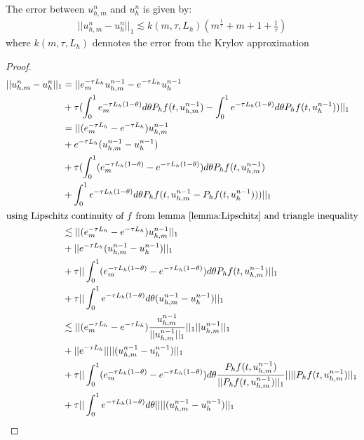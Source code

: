 \begin{lemma}
    The error between $u_{h,m}^n$ and $u_{h}^n$ is given by:
    \begin{align*}
        ||u_{h,m}^n - u_{h}^n||_1 \lesssim k(m,\tau, L_h)(m^\frac{1}{\tau} + m + 1 + \frac{1}{\tau})
    \end{align*}
    where $k(m,\tau,L_h)$ dennotes the error from the Krylov approximation
\end{lemma}
\begin{proof}
    \begin{align*}
        ||u_{h,m}^n - u_{h}^n||_1 &= ||e_m^{-\tau L_h}u_{h,m}^{n-1} - e^{-\tau L_h}u_{h}^{n-1}\\
        & + \tau(\int^1_0e_m^{-\tau L_h(1-\theta)}d\theta P_hf(t, u_{h,m}^{n-1}) - \int^1_0e^{-\tau L_h(1-\theta)}d\theta P_hf(t, u_{h}^{n-1}))||_1\\
        &= ||(e_m^{-\tau L_h}-e^{-\tau L_h})u_{h,m}^{n-1} \\
        & + e^{-\tau L_h}(u_{h,m}^{n-1}-u_{h}^{n-1})\\
        & + \tau(\int^1_0 (e_m^{-\tau L_h(1-\theta)}-e^{-\tau L_h(1-\theta)}) d\theta P_hf(t, u_{h,m}^{n-1})\\
        & + \int^1_0e^{-\tau L_h(1-\theta)}d\theta P_hf(t, u_{h,m}^{n-1}- P_hf(t, u_{h}^{n-1})))||_1\\
        \intertext{using Lipschitz continuity of $f$ from lemma \ref{lemma:Lipschitz} and triangle inequality}
        & \lesssim ||(e_m^{-\tau L_h}-e^{-\tau L_h})u_{h,m}^{n-1}||_1 \\
        & + ||e^{-\tau L_h}(u_{h,m}^{n-1}-u_{h}^{n-1})||_1 \\
        & + \tau||\int^1_0 (e_m^{-\tau L_h(1-\theta)}-e^{-\tau L_h(1-\theta)}) d\theta P_hf(t, u_{h,m}^{n-1})||_1 \\
        & + \tau||\int^1_0e^{-\tau L_h(1-\theta)}d\theta (u_{h,m}^{n-1}- u_{h}^{n-1})||_1 \\
        & \lesssim ||(e_m^{-\tau L_h}-e^{-\tau L_h})\frac{u_{h,m}^{n-1}}{||u_{h,m}^{n-1}||_1}||_1||u_{h,m}^{n-1}||_1 \\
        & + ||e^{-\tau L_h}||||(u_{h,m}^{n-1}-u_{h}^{n-1})||_1 \\
        & + \tau||\int^1_0 (e_m^{-\tau L_h(1-\theta)}-e^{-\tau L_h(1-\theta)}) d\theta \frac{P_hf(t, u_{h,m}^{n-1})}{|| P_hf(t, u_{h,m}^{n-1})||_1}|||| P_hf(t, u_{h,m}^{n-1})||_1 \\
        & + \tau||\int^1_0e^{-\tau L_h(1-\theta)}d\theta|||| (u_{h,m}^{n-1}- u_{h}^{n-1})||_1 \\

\end{align*}
\end{proof}
